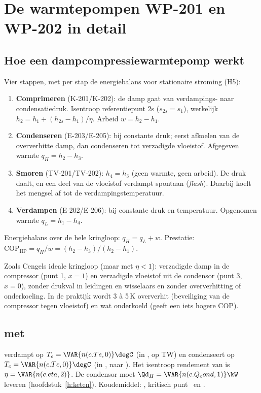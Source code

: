 \chapter{De warmtepompen WP-201 en WP-202 in detail}
\label{h:wp}

\section{Hoe een dampcompressiewarmtepomp werkt}
\begin{methode}
Vier stappen, met per stap de energiebalans voor stationaire stroming (H5):
\begin{enumerate}
  \item[1$\rightarrow$2] \textbf{Comprimeren} (K-201/K-202): de damp gaat van verdampings- naar condensatiedruk.
        Isentroop referentiepunt 2s ($s_{2s}=s_1$), werkelijk $h_2 = h_1 + (h_{2s}-h_1)/\eta$. Arbeid $w = h_2 - h_1$.
  \item[2$\rightarrow$3] \textbf{Condenseren} (E-203/E-205): bij constante druk; eerst afkoelen van de oververhitte damp,
        dan condenseren tot verzadigde vloeistof. Afgegeven warmte $q_H = h_2 - h_3$.
  \item[3$\rightarrow$4] \textbf{Smoren} (TV-201/TV-202): $h_4 = h_3$ (geen warmte, geen arbeid). De druk daalt, en een
        deel van de vloeistof verdampt spontaan (\emph{flash}). Daarbij koelt het mengsel af tot de verdampingstemperatuur.
  \item[4$\rightarrow$1] \textbf{Verdampen} (E-202/E-206): bij constante druk en temperatuur. Opgenomen warmte $q_L = h_1 - h_4$.
\end{enumerate}
Energiebalans over de hele kringloop: $q_H = q_L + w$. Prestatie: $\mathrm{COP}_\mathrm{HP} = q_H/w = (h_2-h_3)/(h_2-h_1)$.
\end{methode}
\begin{aanname}
Zoals Cengels ideale kringloop (maar met $\eta<1$): verzadigde damp in de compressor (punt 1, $x=1$) en verzadigde vloeistof
uit de condensor (punt 3, $x=0$), zonder drukval in leidingen en wisselaars en zonder oververhitting of onderkoeling.
In de praktijk wordt 3 à 5\,K oververhit (beveiliging van de compressor tegen vloeistof) en wat onderkoeld (geeft
een iets hogere COP).
\end{aanname}

\section{ met }
\label{s:\VAR{k}}
 verdampt op $T_e = \VAR{n(c.Te,0)}\degC$ (in , op TW) en condenseert op $T_c = \VAR{n(c.Tc,0)}\degC$
(in ,  naar ). Het isentroop rendement van  is $\eta = \VAR{n(c.eta,2)}$.
De condensor moet $\Qd_H = \VAR{n(c.Q_cond,1)}\kW$ leveren (hoofdstuk~\ref{h:keten}).
Koudemiddel: , kritisch punt \degC\ en \kPa.

